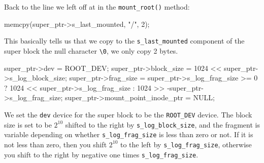 Back to the line we left off at in the \verb|mount_root()| method:
\begin{code}[numbers=left,firstnumber=153,label={[Beginning of /brainix/src/fs/mount.c]End of /brainix/src/fs/mount.c}]
      memcpy(super_ptr->s_last_mounted, "/\0", 2);
\end{code}
This basically tells us that we copy to the \verb|s_last_mounted| component of the super block the null character \verb|\0|, we only copy 2 bytes.

\begin{code}[numbers=left,firstnumber=154,label={[Beginning of /brainix/src/fs/mount.c]End of /brainix/src/fs/mount.c}]
      super_ptr->dev = ROOT_DEV;
      super_ptr->block_size = 1024 << super_ptr->s_log_block_size;
      super_ptr->frag_size = super_ptr->s_log_frag_size >= 0 ?
           1024 << super_ptr->s_log_frag_size :
           1024 >> -super_ptr->s_log_frag_size;
      super_ptr->mount_point_inode_ptr = NULL;
\end{code}
We set the \verb|dev| device for the super block to be the \verb|ROOT_DEV| device. The block size is set to be $2^{10}$ shifted to the right by \verb|s_log_block_size|, and the fragment is variable depending on whether \verb|s_log_frag_size| is less than zero or not. If it is not less than zero, then you shift $2^{10}$ to the left by \verb|s_log_frag_size|, otherwise you shift to the right by negative one times \verb|s_log_frag_size|.


